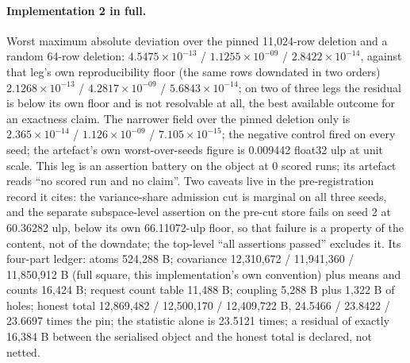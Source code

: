 \documentclass{article} %
\newcommand{\sci}[2]{\ensuremath{#1\times10^{#2}}}
\begin{document}
\paragraph{Implementation 2 in full.} Worst maximum absolute deviation over the pinned 11,024-row
deletion and a random 64-row deletion: \sci{4.5475}{-13} / \sci{1.1255}{-09} / \sci{2.8422}{-14},
against that leg's own reproducibility floor (the same rows downdated in two orders)
\sci{2.1268}{-13} / \sci{4.2817}{-09} / \sci{5.6843}{-14}; on two of three legs the residual is below
its own floor and is not resolvable at all, the best available outcome for an exactness claim. The
narrower field over the pinned deletion only is \sci{2.365}{-14} / \sci{1.126}{-09} /
\sci{7.105}{-15}; the negative control fired on every seed; the artefact's own worst-over-seeds
figure is 0.009442 float32 ulp at unit scale. %
This leg is an assertion battery on the object at 0 scored runs; its artefact reads ``no scored run
and no claim''. Two caveats live in the pre-registration record it cites: the variance-share admission cut is
marginal on all three seeds, and the separate subspace-level assertion on the pre-cut store fails on
seed 2 at 60.36282 ulp, below its own 66.11072-ulp floor, so that failure is a property of the
content, not of the downdate; the top-level ``all assertions passed'' excludes it.
Its four-part ledger: atoms 524,288 B; covariance 12,310,672 / 11,941,360 / 11,850,912 B (full
square, this implementation's own convention) plus means and counts 16,424 B; request count table
11,488 B; coupling 5,288 B plus 1,322 B of holes; honest total 12,869,482 / 12,500,170 / 12,409,722
B, 24.5466 / 23.8422 / 23.6697 times the pin; the statistic alone is 23.5121 times; a residual of %
exactly 16,384 B between the serialised object and the honest total is declared, not netted.
\end{document}
